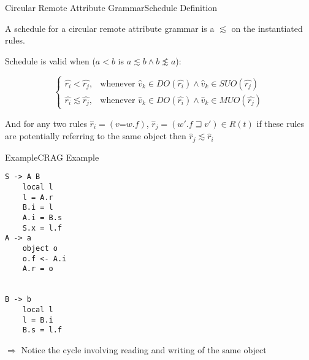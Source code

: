 \begin{frame}{Circular Remote Attribute Grammar}{Schedule Definition}
    
\begin{definition}
A schedule for a circular remote attribute grammar is a \alert{\customorder{}} $\lesssim$ on the \alert{instantiated rules}.
\end{definition}


Schedule is valid when ($a < b$ is $a \lesssim b \wedge b \not \lesssim a$):

\[\begin{cases}
      \hat{r_i} < \hat{r_j},    & \text{whenever } \hat{v}_k \in \mathit{DO}(\hat{r_i}) \wedge \hat{v}_k \in \mathit{SUO}(\hat{r_j}) \\
      \hat{r_i} \lesssim \hat{r_j}, & \text{whenever } \hat{v}_k \in \mathit{DO}(\hat{r_i}) \wedge \hat{v}_k \in \mathit{MUO}(\hat{r_j})  
    \end{cases}\]

    And for any two rules $\hat{r}_i = (v \texttt{=} w.f)$, $\hat{r}_j = (w'.f \sqsupseteq v' ) \in R(t)$ if these rules are \alert{potentially} referring to the same object then $\hat{r}_j \lesssim \hat{r}_i$ 

\end{frame}




\begin{frame}[fragile=singleslide]{Example}{CRAG Example}

\begin{multicols}{3}
\begin{Verbatim}[fontsize=\small]
S -> A B
    local l
    l = A.r
    B.i = l
    A.i = B.s
    S.x = l.f
A -> a
    object o
    o.f <- A.i
    A.r = o


B -> b
    local l
    l = B.i
    B.s = l.f
\end{Verbatim}
\end{multicols}

\newlinevspace

$\Rightarrow$ Notice the \alert{cycle} involving reading and writing of the same object

\end{frame}

